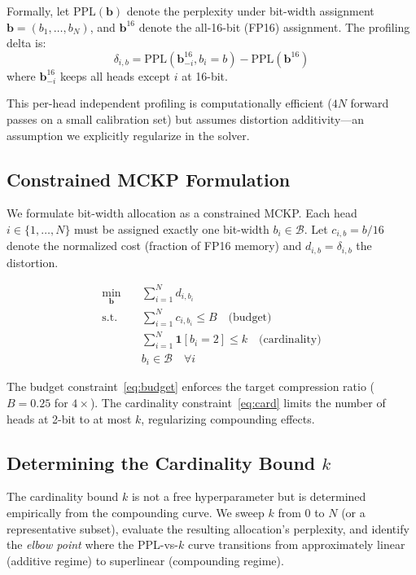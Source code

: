 \documentclass[11pt,a4paper]{article}
\begin{document}
Formally, let $\text{PPL}(\mathbf{b})$ denote the perplexity under bit-width assignment $\mathbf{b} = (b_1, \ldots, b_N)$, and $\mathbf{b}^{16}$ denote the all-16-bit (FP16) assignment.
The profiling delta is:
\begin{equation}
\delta_{i,b} = \text{PPL}(\mathbf{b}^{16}_{-i}, b_i = b) - \text{PPL}(\mathbf{b}^{16})
\end{equation}
where $\mathbf{b}^{16}_{-i}$ keeps all heads except $i$ at 16-bit.

This per-head independent profiling is computationally efficient ($4N$ forward passes on a small calibration set) but assumes distortion additivity---an assumption we explicitly regularize in the solver.

\subsection{Constrained MCKP Formulation}

We formulate bit-width allocation as a constrained MCKP.
Each head $i \in \{1, \ldots, N\}$ must be assigned exactly one bit-width $b_i \in \mathcal{B}$.
Let $c_{i,b} = b / 16$ denote the normalized cost (fraction of FP16 memory) and $d_{i,b} = \delta_{i,b}$ the distortion.

\begin{align}
\min_{\mathbf{b}} &\quad \sum_{i=1}^{N} d_{i, b_i} \label{eq:obj} \\
\text{s.t.} &\quad \sum_{i=1}^{N} c_{i, b_i} \leq B \quad \text{(budget)} \label{eq:budget} \\
&\quad \sum_{i=1}^{N} \mathbf{1}[b_i = 2] \leq k \quad \text{(cardinality)} \label{eq:card} \\
&\quad b_i \in \mathcal{B} \quad \forall i \label{eq:discrete}
\end{align}

The budget constraint~\eqref{eq:budget} enforces the target compression ratio ($B = 0.25$ for $4\times$).
The cardinality constraint~\eqref{eq:card} limits the number of heads at 2-bit to at most $k$, regularizing compounding effects.

\subsection{Determining the Cardinality Bound $k$}

The cardinality bound $k$ is not a free hyperparameter but is determined empirically from the compounding curve.
We sweep $k$ from 0 to $N$ (or a representative subset), evaluate the resulting allocation's perplexity, and identify the \emph{elbow point} where the PPL-vs-$k$ curve transitions from approximately linear (additive regime) to superlinear (compounding regime).
\end{document}
